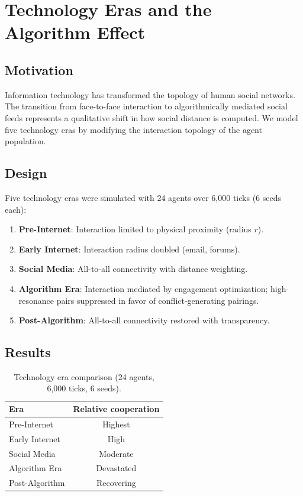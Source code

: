 \documentclass[12pt,a4paper]{article}
\begin{document}
\section{Technology Eras and the Algorithm Effect}
\label{sec:technology}

\subsection{Motivation}

Information technology has transformed the topology of human social networks. The transition from face-to-face interaction to algorithmically mediated social feeds represents a qualitative shift in how social distance is computed. We model five technology eras by modifying the interaction topology of the agent population.

\subsection{Design}

Five technology eras were simulated with 24 agents over 6{,}000 ticks (6 seeds each):

\begin{enumerate}
\item \textbf{Pre-Internet}: Interaction limited to physical proximity (radius $r$).
\item \textbf{Early Internet}: Interaction radius doubled (email, forums).
\item \textbf{Social Media}: All-to-all connectivity with distance weighting.
\item \textbf{Algorithm Era}: Interaction mediated by engagement optimization; high-resonance pairs suppressed in favor of conflict-generating pairings.
\item \textbf{Post-Algorithm}: All-to-all connectivity restored with transparency.
\end{enumerate}

\subsection{Results}

\begin{table}[H]
\centering
\caption{Technology era comparison (24 agents, 6{,}000 ticks, 6 seeds).}
\label{tab:technology}
\begin{tabular}{@{}lc@{}}
\toprule
\textbf{Era} & \textbf{Relative cooperation} \\
\midrule
Pre-Internet     & Highest \\
Early Internet   & High    \\
Social Media     & Moderate \\
Algorithm Era    & Devastated \\
Post-Algorithm   & Recovering \\
\bottomrule
\end{tabular}
\end{table}
\end{document}
